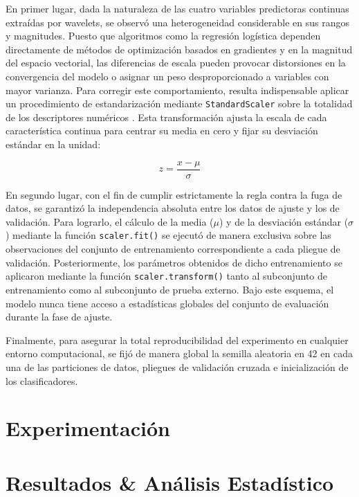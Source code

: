 \documentclass[conference]{IEEEtran}
\begin{document}
	En primer lugar, dada la naturaleza de las cuatro variables predictoras continuas extraídas por wavelets, se observó una heterogeneidad considerable en sus rangos y magnitudes. Puesto que algoritmos como la regresión logística dependen directamente de métodos de optimización basados en gradientes y en la magnitud del espacio vectorial, las diferencias de escala pueden provocar distorsiones en la convergencia del modelo o asignar un peso desproporcionado a variables con mayor varianza. Para corregir este comportamiento, resulta indispensable aplicar un procedimiento de estandarización mediante \texttt{StandardScaler} sobre la totalidad de los descriptores numéricos \cite{datacamp_zscore}. Esta transformación ajusta la escala de cada característica continua para centrar su media en cero y fijar su desviación estándar en la unidad:
	
	\begin{equation}
		z = \frac{x - \mu}{\sigma}
	\end{equation}
	
	En segundo lugar, con el fin de cumplir estrictamente la regla contra la fuga de datos, se garantizó la independencia absoluta entre los datos de ajuste y los de validación. Para lograrlo, el cálculo de la media ($\mu$) y de la desviación estándar ($\sigma$) mediante la función \texttt{scaler.fit()} se ejecutó de manera exclusiva sobre las observaciones del conjunto de entrenamiento correspondiente a cada pliegue de validación. Posteriormente, los parámetros obtenidos de dicho entrenamiento se aplicaron mediante la función \texttt{scaler.transform()} tanto al subconjunto de entrenamiento como al subconjunto de prueba externo. Bajo este esquema, el modelo nunca tiene acceso a estadísticas globales del conjunto de evaluación durante la fase de ajuste.
	
	Finalmente, para asegurar la total reproducibilidad del experimento en cualquier entorno computacional, se fijó de manera global la semilla aleatoria en 42 en cada una de las particiones de datos, pliegues de validación cruzada e inicialización de los clasificadores.
	\section{Experimentación}
	
	\section{Resultados & Análisis Estadístico}
	
\end{document}
